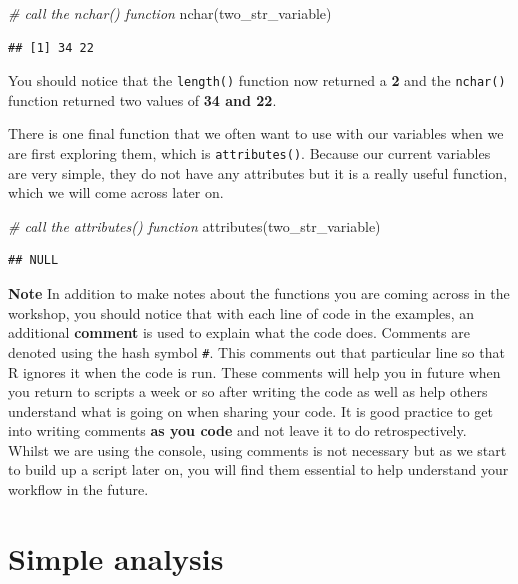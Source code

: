 \documentclass[
]{book}
\newenvironment{Shaded}{\begin{snugshade}}{\end{snugshade}}
\newcommand{\CommentTok}[1]{\textcolor[rgb]{0.56,0.35,0.01}{\textit{#1}}}
\newcommand{\FunctionTok}[1]{\textcolor[rgb]{0.00,0.00,0.00}{#1}}
\newcommand{\NormalTok}[1]{#1}
\begin{document}
\begin{Shaded}
\begin{Highlighting}[]
\CommentTok{\# call the nchar() function}
\FunctionTok{nchar}\NormalTok{(two\_str\_variable)}
\end{Highlighting}
\end{Shaded}

\begin{verbatim}
## [1] 34 22
\end{verbatim}

You should notice that the \texttt{length()} function now returned a \textbf{2} and the \texttt{nchar()} function returned two values of \textbf{34 and 22}.

There is one final function that we often want to use with our variables when we are first exploring them, which is \texttt{attributes()}. Because our current variables are very simple, they do not have any attributes but it is a really useful function, which we will come across later on.

\begin{Shaded}
\begin{Highlighting}[]
\CommentTok{\# call the attributes() function }
\FunctionTok{attributes}\NormalTok{(two\_str\_variable)}
\end{Highlighting}
\end{Shaded}

\begin{verbatim}
## NULL
\end{verbatim}

\textbf{Note}
In addition to make notes about the functions you are coming across in the workshop, you should notice that with each line of code in the examples, an additional \textbf{comment} is used to explain what the code does. Comments are denoted using the hash symbol \texttt{\#}. This comments out that particular line so that R ignores it when the code is run. These comments will help you in future when you return to scripts a week or so after writing the code as well as help others understand what is going on when sharing your code. It is good practice to get into writing comments \textbf{as you code} and not leave it to do retrospectively. Whilst we are using the console, using comments is not necessary but as we start to build up a script later on, you will find them essential to help understand your workflow in the future.

\hypertarget{simple-analysis}{%
\section{Simple analysis}\label{simple-analysis}}
\end{document}
